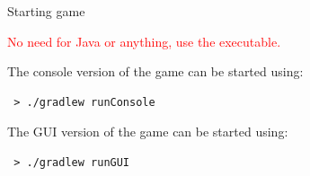 \documentclass{beamer}
\begin{document}
  \begin{frame}[fragile]{Starting game}

    \textcolor{red}{No need for Java or anything, use the executable.}

    The console version of the game can be started using:

    \begin{lstlisting}
 > ./gradlew runConsole
    \end{lstlisting}

    \vspace{3em}

    The GUI version of the game can be started using:

    \begin{lstlisting} 
 > ./gradlew runGUI
    \end{lstlisting}

  \end{frame}
\end{document}
